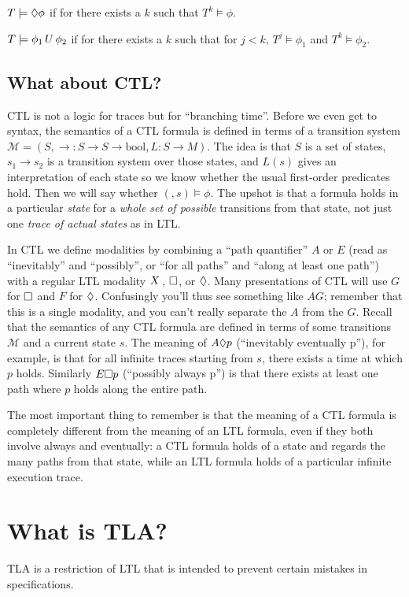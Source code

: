 \documentclass{scrbook}
\begin{document}
$T \models \lozenge \phi$ if for there exists a $k$ such that $T^{k} \models \phi$.

$T \models \phi_1 \,U\, \phi_2$ if for there exists a $k$ such that for
$j < k$, $T^{j} \models \phi_{1}$ and $T^{k} \models \phi_{2}$.

\section{What about CTL?}

CTL is not a logic for traces but for ``branching time''. Before we even get to
syntax, the semantics of a CTL formula is defined in terms of a transition system
$\mathcal{M} = (S, \to : S \to S \to \mathrm{bool}, L : S \to M)$. The idea is that $S$ is a
set of states, $s_1 \to s_2$ is a transition system over those states, and
$L(s)$ gives an interpretation of each state so we know whether the usual
first-order predicates hold. Then we will say whether
$(\mathcal, s) \models \phi$. The upshot is that a formula holds in a particular
\emph{state} for a \emph{whole set of possible} transitions from that state, not
just one \emph{trace of actual states} as in LTL.

In CTL we define modalities by combining a ``path quantifier'' $A$ or $E$ (read
as ``inevitably'' and ``possibly'', or ``for all paths'' and ``along at least
one path'') with a regular LTL modality $X\,$, $\square$, or $\lozenge$.
Many presentations of CTL will use $G$ for $\square$ and $F$ for $\lozenge$.
Confusingly you'll thus see something like $AG$; remember that this is a single
modality, and you can't really separate the $A$ from the $G$. Recall that the
semantics of any CTL formula are defined in terms of some transitions
$\mathcal{M}$ and a current state $s$. The meaning of $A\lozenge p$
(``inevitably eventually p''), for example, is that for all infinite traces
starting from $s$, there exists a time at which $p$ holds. Similarly
$E \square p$ (``possibly always p'') is that there exists at least one path
where $p$ holds along the entire path.

The most important thing to remember is that the meaning of a CTL formula is
completely different from the meaning of an LTL formula, even if they both
involve always and eventually: a CTL formula holds of a state and regards the
many paths from that state, while an LTL formula holds of a particular infinite
execution trace.

\chapter{What is TLA?}

TLA is a restriction of LTL that is intended to prevent certain mistakes in
specifications.
\end{document}
